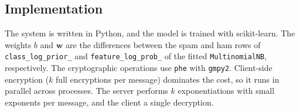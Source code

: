\subsection{Implementation}

The system is written in Python, and the model is trained with scikit-learn.
The weights $b$ and $\mathbf{w}$ are the differences between the spam and ham rows of \texttt{class\_log\_prior\_} and \texttt{feature\_log\_prob\_} of the fitted \texttt{MultinomialNB}, respectively.
The cryptographic operations use \texttt{phe} with \texttt{gmpy2}.
Client-side encryption ($k$ full encryptions per message) dominates the cost, so it runs in parallel across processes.
The server performs $k$ exponentiations with small exponents per message, and the client a single decryption.
